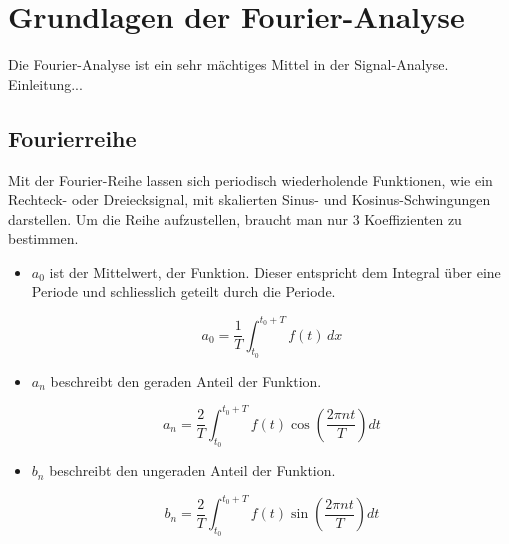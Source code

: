 %
%
%
%

\section{Grundlagen der Fourier-Analyse\label{fourier:section:teil0}}

Die Fourier-Analyse ist ein sehr mächtiges Mittel in der Signal-Analyse. 
Einleitung...




\subsection{Fourierreihe\label{fourier:subsection:fourierreihe}}

Mit der Fourier-Reihe lassen sich periodisch wiederholende Funktionen, wie ein Rechteck- oder Dreiecksignal, mit skalierten Sinus- und Kosinus-Schwingungen darstellen.
Um die Reihe aufzustellen, braucht man nur 3 Koeffizienten zu bestimmen. 

\begin{itemize}
	\item $a_0$ ist der Mittelwert, der Funktion. 
	Dieser entspricht dem Integral über eine Periode und schliesslich geteilt durch die Periode. 
	
	\begin{equation}
		a_0 = \frac{1}{T} \int_{t_0}^{t_0 + T} f(t) \, dx
	\end{equation}
	
	\item $a_n$ beschreibt den geraden Anteil der Funktion.
	
	\begin{equation}
		a_n = \frac{2}{T} \int_{t_0}^{t_0 + T} f(t) \cos\left(\frac{2\pi n t}{T}\right) dt
	\end{equation}
	
	\item $b_n$ beschreibt den ungeraden Anteil der Funktion.
	
	\begin{equation}
		b_n = \frac{2}{T} \int_{t_0}^{t_0 + T} f(t) \sin\left(\frac{2\pi n t}{T}\right) dt
	\end{equation}
	
\end{itemize}

